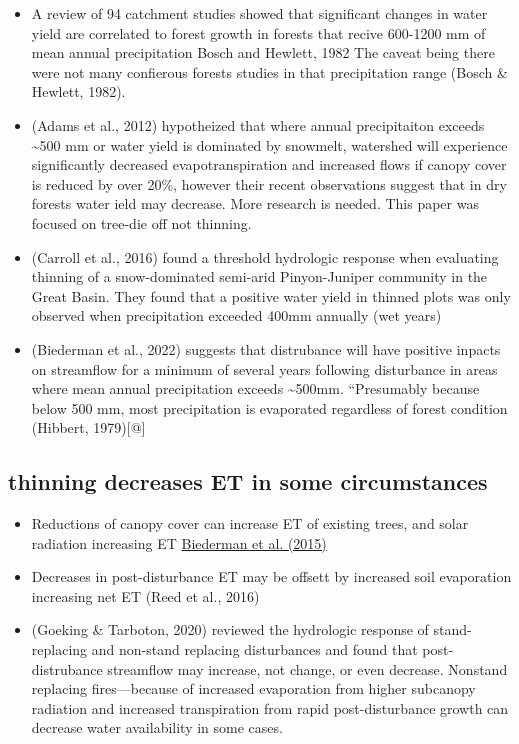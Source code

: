 \documentclass[
]{agujournal2019}
\begin{document}
\begin{itemize}
\item
  A review of 94 catchment studies showed that significant changes in
  water yield are correlated to forest growth in forests that recive
  600-1200 mm of mean annual precipitation Bosch and Hewlett, 1982 The
  caveat being there were not many confierous forests studies in that
  precipitation range (Bosch \& Hewlett, 1982).
\item
  (Adams et al., 2012) hypotheized that where annual precipitaiton
  exceeds \textasciitilde500 mm or water yield is dominated by snowmelt,
  watershed will experience significantly decreased evapotranspiration
  and increased flows if canopy cover is reduced by over 20\%, however
  their recent observations suggest that in dry forests water ield may
  decrease. More research is needed. This paper was focused on tree-die
  off not thinning.
\item
  (Carroll et al., 2016) found a threshold hydrologic response when
  evaluating thinning of a snow-dominated semi-arid Pinyon-Juniper
  community in the Great Basin. They found that a positive water yield
  in thinned plots was only observed when precipitation exceeded 400mm
  annually (wet years)
\item
  (Biederman et al., 2022) suggests that distrubance will have positive
  inpacts on streamflow for a minimum of several years following
  disturbance in areas where mean annual precipitation exceeds
  \textasciitilde500mm. ``Presumably because below 500 mm, most
  precipitation is evaporated regardless of forest condition (Hibbert,
  1979){[}@{]}
\end{itemize}

\subsection{thinning decreases ET in some
circumstances}\label{thinning-decreases-et-in-some-circumstances}

\begin{itemize}
\item
  Reductions of canopy cover can increase ET of existing trees, and
  solar radiation increasing ET
  \href{Chen\%20et\%20al.,\%202005;\%20Bennett\%20et\%20al.,\%202018}{Biederman
  et al. (2015)}
\item
  Decreases in post-disturbance ET may be offsett by increased soil
  evaporation increasing net ET (Reed et al., 2016)
\item
  (Goeking \& Tarboton, 2020) reviewed the hydrologic response of
  stand-replacing and non-stand replacing disturbances and found that
  post-distrubance streamflow may increase, not change, or even
  decrease. Nonstand replacing fires---because of increased evaporation
  from higher subcanopy radiation and increased transpiration from rapid
  post-disturbance growth can decrease water availability in some cases.
\end{itemize}
\end{document}
